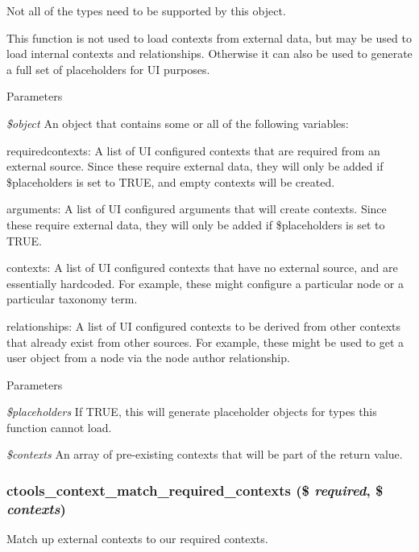 Not all of the types need to be supported by this object.

This function is not used to load contexts from external data, but may be used to load internal contexts and relationships. Otherwise it can also be used to generate a full set of placeholders for UI purposes.


\begin{DoxyParams}{Parameters}
\item[{\em \$object}]An object that contains some or all of the following variables:\end{DoxyParams}

\begin{DoxyItemize}
\item requiredcontexts: A list of UI configured contexts that are required from an external source. Since these require external data, they will only be added if \$placeholders is set to TRUE, and empty contexts will be created.
\item arguments: A list of UI configured arguments that will create contexts. Since these require external data, they will only be added if \$placeholders is set to TRUE.
\item contexts: A list of UI configured contexts that have no external source, and are essentially hardcoded. For example, these might configure a particular node or a particular taxonomy term.
\item relationships: A list of UI configured contexts to be derived from other contexts that already exist from other sources. For example, these might be used to get a user object from a node via the node author relationship. 
\begin{DoxyParams}{Parameters}
\item[{\em \$placeholders}]If TRUE, this will generate placeholder objects for types this function cannot load. \item[{\em \$contexts}]An array of pre-\/existing contexts that will be part of the return value. \end{DoxyParams}

\end{DoxyItemize}\hypertarget{context_8inc_a1b7e066112a4bc88f38d407e1656f63e}{
\subsubsection[{ctools\_\-context\_\-match\_\-required\_\-contexts}]{\setlength{\rightskip}{0pt plus 5cm}ctools\_\-context\_\-match\_\-required\_\-contexts (\$ {\em required}, \/  \$ {\em contexts})}}
\label{context_8inc_a1b7e066112a4bc88f38d407e1656f63e}
Match up external contexts to our required contexts.

